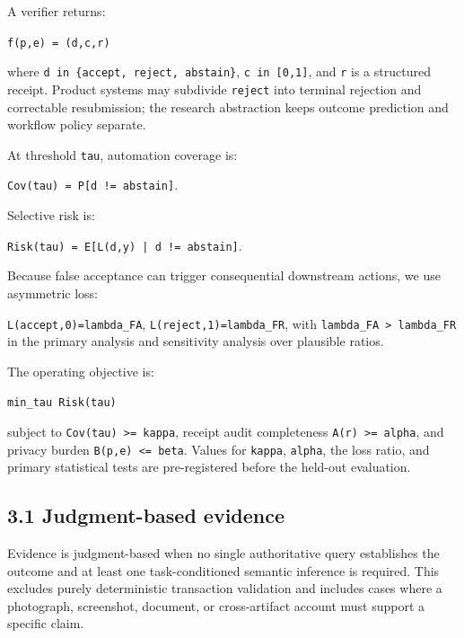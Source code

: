 \documentclass[11pt]{article}
\begin{document}
A verifier returns:\par

\texttt{f(p,e) = (d,c,r)}\par

where \texttt{d  in  \{accept, reject, abstain\}}, \texttt{c  in  [0,1]}, and \texttt{r} is a structured receipt. Product systems may subdivide \texttt{reject} into terminal rejection and correctable resubmission; the research abstraction keeps outcome prediction and workflow policy separate.\par

At threshold \texttt{tau}, automation coverage is:\par

\texttt{Cov(tau) = P[d != abstain]}.\par

Selective risk is:\par

\texttt{Risk(tau) = E[L(d,y) | d != abstain]}.\par

Because false acceptance can trigger consequential downstream actions, we use asymmetric loss:\par

\texttt{L(accept,0)=lambda\_FA}, \texttt{L(reject,1)=lambda\_FR}, with \texttt{lambda\_FA > lambda\_FR} in the primary analysis and sensitivity analysis over plausible ratios.\par

The operating objective is:\par

\texttt{min\_tau Risk(tau)}\par

subject to \texttt{Cov(tau) >= kappa}, receipt audit completeness \texttt{A(r) >= alpha}, and privacy burden \texttt{B(p,e) <= beta}. Values for \texttt{kappa}, \texttt{alpha}, the loss ratio, and primary statistical tests are pre-registered before the held-out evaluation.\par

\subsection{3.1 Judgment-based evidence}

Evidence is judgment-based when no single authoritative query establishes the outcome and at least one task-conditioned semantic inference is required. This excludes purely deterministic transaction validation and includes cases where a photograph, screenshot, document, or cross-artifact account must support a specific claim.\par
\end{document}

